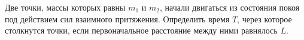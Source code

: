 Две точки, массы которых равны $m_1$ и $m_2$, начали двигаться
из состояния покоя под действием сил взаимного притяжения. Определить
время $T$, через которое столкнутся точки, если первоначальное
расстояние между ними равнялось $L$.
